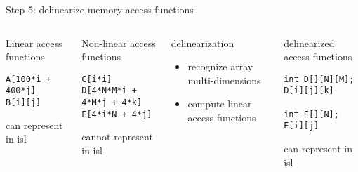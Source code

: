 \documentclass{beamer}
\begin{document}
\begin{frame}[fragile]{Step 5: delinearize memory access functions}
  \begin{columns}[T,onlytextwidth] %
    \begin{block}{\small Linear access functions}
      \begin{lstlisting}
A[100*i + 400*j]
B[i][j]
      \end{lstlisting}
      {\small \color{myblue} can represent in isl}
    \end{block}

    \vspace{.7cm}
    \pause
    \begin{block}{\small Non-linear access functions} 
      \begin{lstlisting}
C[i*i]
D[4*N*M*i + 4*M*j + 4*k]
E[4*i*N + 4*j]
      \end{lstlisting}

      {\small \color{myred} cannot represent in isl}
    \end{block}
    \pause
    \begin{block}{\small delinearization}
      \begin{itemize}
      \item recognize array multi-dimensions
      \item compute linear access functions
      \end{itemize}
    \end{block}
    \pause
    \begin{block}{\small delinearized access functions}
      \begin{lstlisting}
int D[][N][M];
D[i][j][k]

int E[][N];
E[i][j]
      \end{lstlisting}

      {\small \color{myblue} can represent in isl}
    \end{block}
  \end{columns}
\end{frame}
\end{document}
